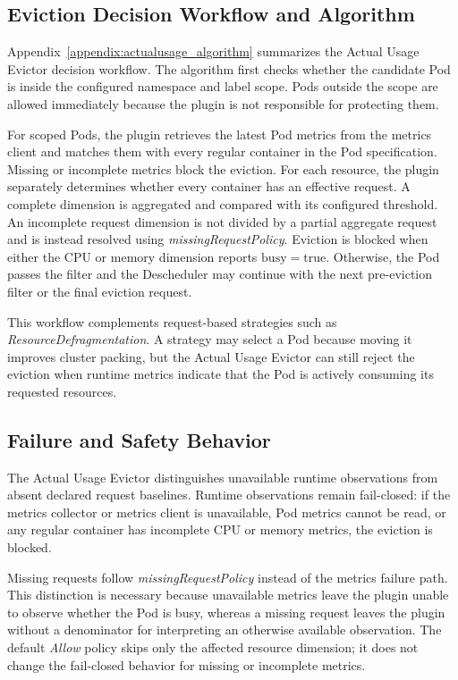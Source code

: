 \subsection{Eviction Decision Workflow and Algorithm}
\label{sec:actualusage_algorithm}

Appendix~\ref{appendix:actualusage_algorithm} summarizes the Actual Usage Evictor decision workflow. The algorithm first checks whether the candidate Pod is inside the configured namespace and label scope. Pods outside the scope are allowed immediately because the plugin is not responsible for protecting them.

For scoped Pods, the plugin retrieves the latest Pod metrics from the metrics client and matches them with every regular container in the Pod specification. Missing or incomplete metrics block the eviction. For each resource, the plugin separately determines whether every container has an effective request. A complete dimension is aggregated and compared with its configured threshold. An incomplete request dimension is not divided by a partial aggregate request and is instead resolved using \textit{missingRequestPolicy}. Eviction is blocked when either the CPU or memory dimension reports \(\mathrm{busy}=\mathrm{true}\). Otherwise, the Pod passes the filter and the Descheduler may continue with the next pre-eviction filter or the final eviction request.

This workflow complements request-based strategies such as \textit{ResourceDefragmentation}. A strategy may select a Pod because moving it improves cluster packing, but the Actual Usage Evictor can still reject the eviction when runtime metrics indicate that the Pod is actively consuming its requested resources.

\subsection{Failure and Safety Behavior}
\label{sec:actualusage_safety}

The Actual Usage Evictor distinguishes unavailable runtime observations from absent declared request baselines. Runtime observations remain fail-closed: if the metrics collector or metrics client is unavailable, Pod metrics cannot be read, or any regular container has incomplete CPU or memory metrics, the eviction is blocked.

Missing requests follow \textit{missingRequestPolicy} instead of the metrics failure path. This distinction is necessary because unavailable metrics leave the plugin unable to observe whether the Pod is busy, whereas a missing request leaves the plugin without a denominator for interpreting an otherwise available observation. The default \textit{Allow} policy skips only the affected resource dimension; it does not change the fail-closed behavior for missing or incomplete metrics.

